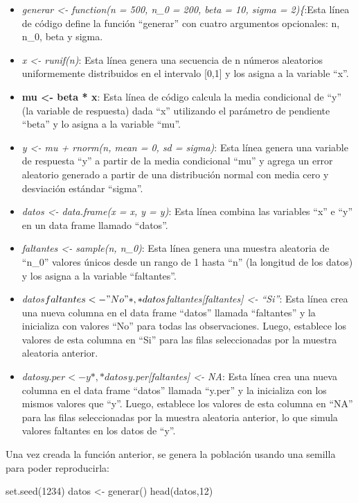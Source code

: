 \documentclass[
  12pt,
]{book}
\newenvironment{Shaded}{\begin{snugshade}}{\end{snugshade}}
\newcommand{\DecValTok}[1]{\textcolor[rgb]{0.00,0.00,0.81}{#1}}
\newcommand{\FunctionTok}[1]{\textcolor[rgb]{0.00,0.00,0.00}{#1}}
\newcommand{\NormalTok}[1]{#1}
\newcommand{\OtherTok}[1]{\textcolor[rgb]{0.56,0.35,0.01}{#1}}
\begin{document}
\begin{itemize}
\item
  \emph{generar \textless- function(n = 500, n\_0 = 200, beta = 10, sigma = 2)\{}:Esta línea de código define la función ``generar'' con cuatro argumentos opcionales: n, n\_0, beta y sigma.
\item
  \emph{x \textless- runif(n)}: Esta línea genera una secuencia de n números aleatorios uniformemente distribuidos en el intervalo {[}0,1{]} y los asigna a la variable ``x''.
\item
  \textbf{mu \textless- beta * x}: Esta línea de código calcula la media condicional de ``y'' (la variable de respuesta) dada ``x'' utilizando el parámetro de pendiente ``beta'' y lo asigna a la variable ``mu''.
\item
  \emph{y \textless- mu + rnorm(n, mean = 0, sd = sigma)}: Esta línea genera una variable de respuesta ``y'' a partir de la media condicional ``mu'' y agrega un error aleatorio generado a partir de una distribución normal con media cero y desviación estándar ``sigma''.
\item
  \emph{datos \textless- data.frame(x = x, y = y)}: Esta línea combina las variables ``x'' e ``y'' en un data frame llamado ``datos''.
\item
  \emph{faltantes \textless- sample(n, n\_0)}: Esta línea genera una muestra aleatoria de ``n\_0'' valores únicos desde un rango de 1 hasta ``n'' (la longitud de los datos) y los asigna a la variable ``faltantes''.
\item
  \emph{datos\(faltantes <- "No"*, *datos\)faltantes{[}faltantes{]} \textless- ``Si''}: Esta línea crea una nueva columna en el data frame ``datos'' llamada ``faltantes'' y la inicializa con valores ``No'' para todas las observaciones. Luego, establece los valores de esta columna en ``Si'' para las filas seleccionadas por la muestra aleatoria anterior.
\item
  \emph{datos\(y.per <- y*, *datos\)y.per{[}faltantes{]} \textless- NA}: Esta línea crea una nueva columna en el data frame ``datos'' llamada ``y.per'' y la inicializa con los mismos valores que ``y''. Luego, establece los valores de esta columna en ``NA'' para las filas seleccionadas por la muestra aleatoria anterior, lo que simula valores faltantes en los datos de ``y''.
\end{itemize}

Una vez creada la función anterior, se genera la población usando una semilla para poder reproducirla:

\begin{Shaded}
\begin{Highlighting}[]
\FunctionTok{set.seed}\NormalTok{(}\DecValTok{1234}\NormalTok{)}
\NormalTok{datos }\OtherTok{\textless{}{-}} \FunctionTok{generar}\NormalTok{()}
\FunctionTok{head}\NormalTok{(datos,}\DecValTok{12}\NormalTok{)}
\end{Highlighting}
\end{Shaded}
\end{document}
